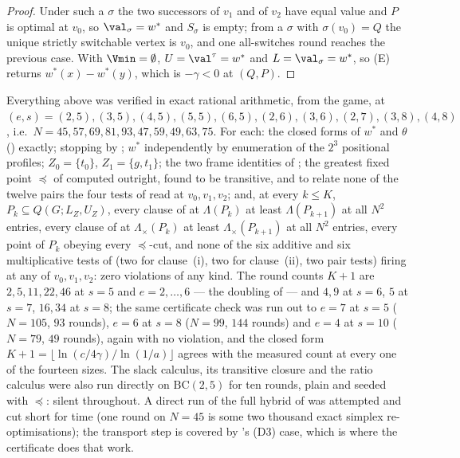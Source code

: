 \begin{proof}
Under such a $\sigma$ the two successors of $v_1$ and of $v_2$ have equal
value and $P$ is optimal at $v_0$, so $\val_\sigma=w^\ast$ and $S_\sigma$
is empty; from a $\sigma$ with $\sigma(v_0)=Q$ the unique strictly
switchable vertex is $v_0$, and one all-switches round reaches the
previous case. With $\Vmin=\emptyset$, $U=\val^{\tau}=w^\ast$ and
$L=\val_\sigma=w^\ast$, so \textup{(E)} returns $w^\ast(x)-w^\ast(y)$,
which is $-\gamma<0$ at $(Q,P)$.
\end{proof}

\begin{remark}[Measured]\label{ob:measured}
Everything above was verified in exact rational arithmetic, from the game,
at $(e,s)=(2,5),(3,5),(4,5),(5,5),(6,5),(2,6),(3,6),(2,7),(3,8),(4,8)$,
i.e.\ $N=45,57,69,81,93,47,59,49,63,75$. For each: the closed forms of
$w^\ast$ and $\theta$ () exactly; stopping by
; $w^\ast$ independently by enumeration of the $2^{3}$
positional profiles; $Z_0=\{t_0\}$, $Z_1=\{g,t_1\}$; the two frame
identities of ; the greatest fixed point $\preceq$ of
 computed outright, found to be transitive, and to
relate none of the twelve pairs the four tests of
 read at $v_0,v_1,v_2$; and, at every $k\le K$,
$P_k\subseteq Q(G;L_Z,U_Z)$, every clause of  at
$\Lambda(P_k)$ at least $\Lambda(P_{k+1})$ at all $N^{2}$ entries, every
clause of  at $\Lambda_\times(P_k)$ at least
$\Lambda_\times(P_{k+1})$ at all $N^{2}$ entries, every point of $P_k$
obeying every $\preceq$-cut, and none of the six additive and six
multiplicative tests of  (two for clause~(i), two
for clause~(ii), two pair tests) firing at any of $v_0,v_1,v_2$: zero
violations of any kind. The round counts $K+1$ are
$2,5,11,22,46$ at $s=5$ and $e=2,\dots,6$ --- the doubling of
 --- and $4,9$ at $s=6$, $5$ at $s=7$, $16,34$ at
$s=8$; the same certificate check was run out to $e=7$ at $s=5$
($N=105$, $93$ rounds), $e=6$ at $s=8$ ($N=99$, $144$ rounds) and
$e=4$ at $s=10$ ($N=79$, $49$ rounds), again with no violation, and the
closed form $K+1=\lfloor\ln(c/4\gamma)/\ln(1/a)\rfloor$ agrees with the
measured count at every one of the fourteen sizes. The slack calculus,
its transitive closure and the ratio calculus were also run directly on
$\mathrm{BC}(2,5)$ for ten rounds, plain and seeded with $\preceq$:
silent throughout. A direct run of the full hybrid of 
was attempted and cut short for time (one round on $N=45$ is some two
thousand exact simplex re-optimisations); the transport step is covered
by 's \textup{(D3)} case, which is where the
certificate does that work.


\end{remark}
